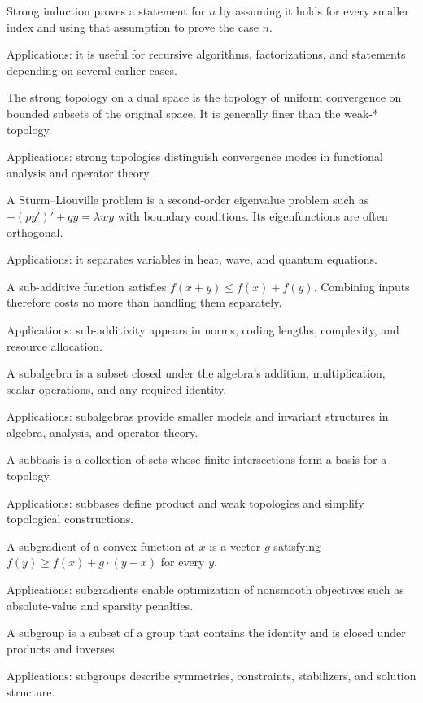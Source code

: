 Strong induction proves a statement for $n$ by assuming it holds for every smaller index and using that assumption to prove the case $n$. \par\noindent Applications: it is useful for recursive algorithms, factorizations, and statements depending on several earlier cases.

The strong topology on a dual space is the topology of uniform convergence on bounded subsets of the original space. It is generally finer than the weak-* topology. \par\noindent Applications: strong topologies distinguish convergence modes in functional analysis and operator theory.

A Sturm--Liouville problem is a second-order eigenvalue problem such as $-(py')'+qy=\lambda wy$ with boundary conditions. Its eigenfunctions are often orthogonal. \par\noindent Applications: it separates variables in heat, wave, and quantum equations.

A sub-additive function satisfies $f(x+y)\leq f(x)+f(y)$. Combining inputs therefore costs no more than handling them separately. \par\noindent Applications: sub-additivity appears in norms, coding lengths, complexity, and resource allocation.

A subalgebra is a subset closed under the algebra's addition, multiplication, scalar operations, and any required identity. \par\noindent Applications: subalgebras provide smaller models and invariant structures in algebra, analysis, and operator theory.

A subbasis is a collection of sets whose finite intersections form a basis for a topology. \par\noindent Applications: subbases define product and weak topologies and simplify topological constructions.

A subgradient of a convex function at $x$ is a vector $g$ satisfying $f(y)\geq f(x)+g\cdot(y-x)$ for every $y$. \par\noindent Applications: subgradients enable optimization of nonsmooth objectives such as absolute-value and sparsity penalties.

A subgroup is a subset of a group that contains the identity and is closed under products and inverses. \par\noindent Applications: subgroups describe symmetries, constraints, stabilizers, and solution structure.

